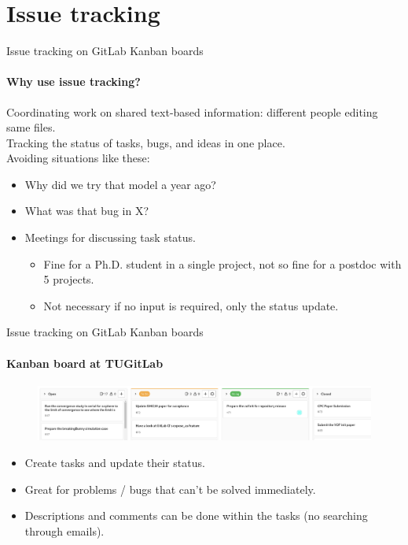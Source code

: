 \section{Issue tracking}

\begin{frame}{Issue tracking on GitLab Kanban boards} 
    \framesubtitle{Why use issue tracking?}
    \vfill

    Coordinating work on shared text-based information: different people editing same files.\\ 
    Tracking the status of tasks, bugs, and ideas in one place.\\
    Avoiding situations like these:
    \begin{itemize}  
        \item Why did we try that model a year ago?
        \item What was that bug in X?
        \item Meetings for discussing task status. 
            \begin{itemize}
                \item Fine for a Ph.D. student in a single project, not so fine for a postdoc with 5 projects. 
                \item Not necessary if no input is required, only the status update. 
            \end{itemize}
    \end{itemize}

\end{frame}

\begin{frame}{Issue tracking on GitLab Kanban boards} 
    \framesubtitle{Kanban board at TUGitLab}
    \vfill

    \begin{figure}
        \includegraphics[width=\textwidth]{figures/kanban-board-gitlab.png}
    \end{figure}

    \begin{itemize}
        \item Create tasks and update their status.  
        \item Great for problems / bugs that can't be solved immediately. 
        \item Descriptions and comments can be done within the tasks (no searching through emails).  
    \end{itemize}

\end{frame}

